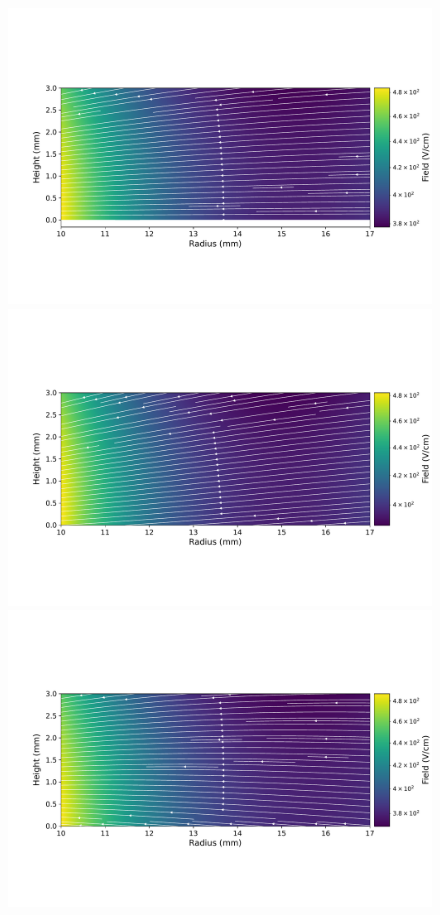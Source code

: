 \begin{figure}
\centering
\includegraphics[trim={1.5cm 3.2cm 0.10cm 4.6cm},clip,width=0.95\linewidth]{ch3/figs/elect_field_lines_surface_ponama_1_sc_0.0.pdf}
\includegraphics[trim={1.5cm 3.2cm 0.1cm 4.6cm},clip,width=0.95\linewidth]{ch3/figs/elect_field_lines_surface_ponama_1_sc_-0.5.pdf}
\includegraphics[trim={1.5cm 3.2cm 0.1cm 4.6cm},clip,width=0.95\linewidth]{ch3/figs/elect_field_lines_surface_ponama_1_sc_0.5.pdf}

\end{figure}
